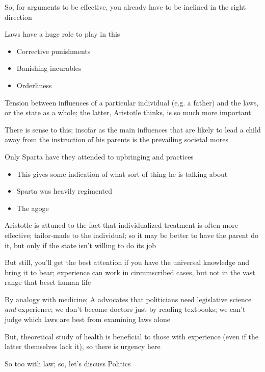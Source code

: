 \documentclass[11pt]{article}
\begin{document}
\noindent So, for arguments to be effective, you already have to be inclined in the right direction
\vspace*{2mm}

\noindent Laws have a huge role to play in this

\begin{itemize}\item{Corrective punishments}\item{Banishing incurables}\item{Orderliness}\end{itemize}

\noindent Tension between influences of a particular individual (e.g. a father) and the laws, or the state as a whole; the latter, Aristotle thinks, is so much more important
\vspace*{2mm}

\noindent There is sense to this; insofar as the main influences that are likely to lead a child away from the instruction of his parents is the prevailing societal mores
\vspace*{2mm}

\noindent Only Sparta have they attended to upbringing and practices

\begin{itemize}\item{This gives some indication of what sort of thing he is talking about}\item{Sparta was heavily regimented}\item{The agoge}\end{itemize}

\noindent Aristotle is attuned to the fact that individualized treatment is often more effective; tailor-made to the individual; so it may be better to have the parent do it, but only if the state isn't willing to do its job
\vspace*{2mm}

\noindent But still, you'll get the best attention if you have the universal knowledge and bring it to bear; experience can work in circumscribed cases, but not in the vast range that beset human life
\vspace*{2mm}

\noindent By analogy with medicine; A advocates that politicians need legislative science \emph{and} experience; we don't become doctors just by reading textbooks; we can't judge which laws are best from examining laws alone
\vspace*{2mm}

\noindent But, theoretical study of health is beneficial to those with experience (even if the latter themselves lack it), so there is urgency here
\vspace*{2mm}

\noindent So too with law; so, let's discuss Politics
\end{document}

